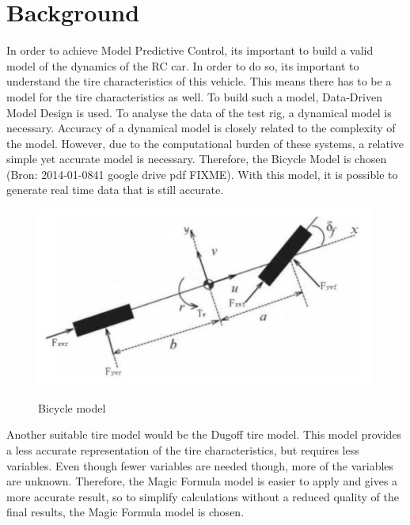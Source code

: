 \section{Background}
In order to achieve Model Predictive Control, it\textquotesingle s important to build a valid model of the dynamics of the RC car. In order to do so, it\textquotesingle  s important to understand the tire characteristics of this vehicle. This means there has to be a model for the tire characteristics as well. To build such a model, Data-Driven Model Design is used. 
To analyse the data of the test rig, a dynamical model is necessary. Accuracy of a dynamical model is closely related to the complexity of the model. However, due to the computational burden of these systems, a relative simple yet accurate model is necessary. Therefore, the Bicycle Model is chosen (Bron: 2014-01-0841 google drive pdf FIXME). With this model, it is possible to generate real time data that is still accurate. 

\begin{figure}
	\centering
		\includegraphics[scale=0.5]{figure/bicyclemodel.jpg}
	\label{fig:bicyclemodel}
	\caption{Bicycle model}
\end{figure}
Another suitable tire model would be the Dugoff tire model. This model provides a less accurate representation of the tire characteristics, but requires less variables. Even though fewer variables are needed though, more of the variables are unknown. Therefore, the Magic Formula model is easier to apply and gives a more accurate result, so to simplify calculations without a reduced quality of the final results, the Magic Formula model is chosen. 


